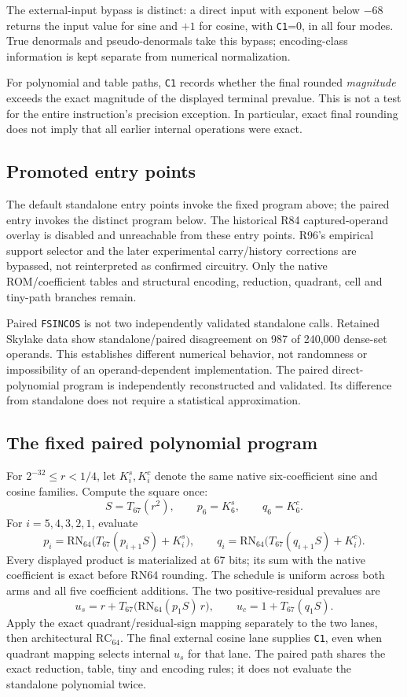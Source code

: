 \documentclass[11pt]{article}
\newcommand{\rn}[1]{\mathrm{RN}_{#1}}       %
\newcommand{\instr}[1]{\texttt{#1}}
\begin{document}
The external-input bypass is distinct: a direct input with exponent below
$-68$ returns the input value for sine and $+1$ for cosine, with
\texttt{C1}=0, in all four modes. True denormals and pseudo-denormals take
this bypass; encoding-class information is kept separate from numerical
normalization.

For polynomial and table paths, \texttt{C1} records whether the final rounded
\emph{magnitude} exceeds the exact magnitude of the displayed terminal
prevalue. This is not a test for the entire instruction's precision exception.
In particular, exact final rounding does not imply that all earlier internal
operations were exact.

\subsection{Promoted entry points}
\label{sec:terminal}

The default standalone entry points invoke the fixed program above; the
paired entry invokes the distinct program below.
The historical R84 captured-operand overlay is disabled and unreachable
from these entry points. R96's empirical support selector and the later
experimental carry/history corrections are bypassed, not reinterpreted as
confirmed circuitry. Only the native ROM/coefficient tables and structural
encoding, reduction, quadrant, cell and tiny-path branches remain.

Paired \instr{FSINCOS} is not two independently validated standalone calls.
Retained Skylake data show standalone/paired disagreement on 987 of
240{,}000 dense-set operands. This establishes different numerical behavior,
not randomness or impossibility of an operand-dependent implementation.
The paired direct-polynomial program is independently reconstructed and
validated. Its difference from standalone does not require a statistical
approximation.

\subsection{The fixed paired polynomial program}
\label{sec:paired}

For $2^{-32}\le r<1/4$, let $K_i^s,K_i^c$ denote the same native
six-coefficient sine and cosine families. Compute the square once:
\[
 S=T_{67}(r^2),\qquad p_6=K_6^s,\qquad q_6=K_6^c.
\]
For $i=5,4,3,2,1$, evaluate
\[
 p_i=\rn{64}\bigl(T_{67}(p_{i+1}S)+K_i^s\bigr),\qquad
 q_i=\rn{64}\bigl(T_{67}(q_{i+1}S)+K_i^c\bigr).
\]
Every displayed product is materialized at 67 bits; its sum with the native
coefficient is exact before RN64 rounding. The schedule is uniform across
both arms and all five coefficient additions.
The two positive-residual prevalues are
\[
 u_s=r+T_{67}\bigl(\rn{64}(p_1S)\,r\bigr),\qquad
 u_c=1+T_{67}(q_1S).
\]
Apply the exact quadrant/residual-sign mapping separately to the two lanes,
then architectural $\mathrm{RC}_{64}$. The final external cosine lane supplies
\texttt{C1}, even when quadrant mapping selects internal $u_s$ for that lane.
The paired path shares the exact reduction, table, tiny and encoding rules;
it does not evaluate the standalone polynomial twice.
\end{document}
